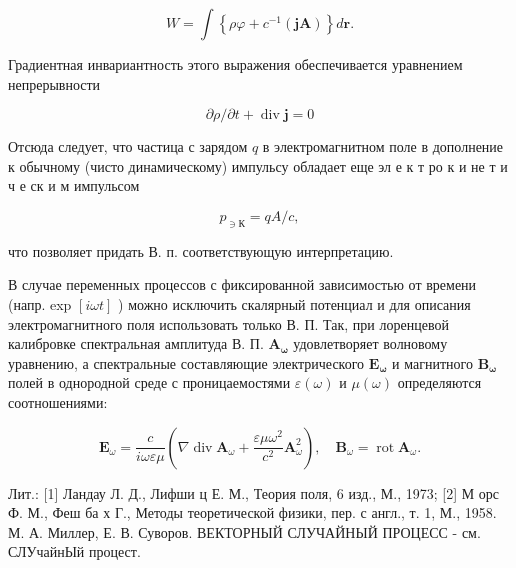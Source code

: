 \documentclass[10pt]{article}
\begin{document}
\[

W=\int\left\{\rho \varphi+c^{-1}(\boldsymbol{j A})\right\} d \boldsymbol{r} .

\]



Градиентная инвариантность этого выражения обеспечивается уравнением непрерывности



\[

\partial \rho / \partial t+\operatorname{div} \boldsymbol{j}=0

\]



Отсюда следует, что частица с зарядом $q$ в электромагнитном поле в дополнение к обычному (чисто динамическому) импульсу обладает еще эл е к т ро к и не т и ч е ск и м импульсом



\[

p_{\ni К}=q A / c,

\]



что позволяет придать В. п. соответствующую интерпретацию.



В случае переменных процессов с фиксированной зависимостью от времени (напр. exp $[i \omega t]$ ) можно исключить скалярный потенциал и для описания электромагнитного поля использовать только В. П. Так, при лоренцевой калибровке спектральная амплитуда В. П. $\boldsymbol{A}_{\boldsymbol{\omega}}$ удовлетворяет волновому уравнению, а спектральные составляющие электрического $\boldsymbol{E}_{\boldsymbol{\omega}}$ и магнитного $\boldsymbol{B}_{\boldsymbol{\omega}}$ полей в однородной среде с проницаемостями $\varepsilon(\omega)$ и $\mu(\omega)$ определяются соотношениями:



\[

\boldsymbol{E}_{\omega}=\frac{c}{i \omega \varepsilon \mu}\left(\nabla \operatorname{div} \boldsymbol{A}_{\omega}+\frac{\varepsilon \mu \omega^{2}}{c^{2}} \boldsymbol{A}_{\omega}^{2}\right), \quad \boldsymbol{B}_{\omega}=\operatorname{rot} \boldsymbol{A}_{\omega} .

\]



Лит.: [1] Ландау Л. Д., Лифши ц Е. М., Теория поля, 6 изд., М., 1973; [2] М орс Ф. М., Феш ба х Г., Методы теоретической физики, пер. с англ., т. 1, М., 1958. М. А. Миллер, Е. В. Суворов. ВЕКТОРНЫЙ СЛУЧАЙНЫЙ ПРОЦЕСС - см. СЛУчайнЫй процест.
\end{document}
